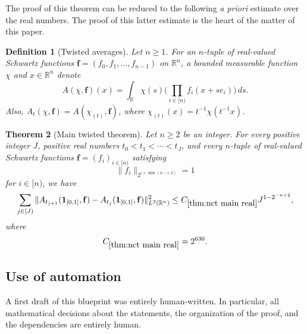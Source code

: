 \documentclass[12pt,reqno]{amsart}
\theoremstyle{plain}
\newtheorem{theorem}{Theorem}[section]
\newtheorem{definition}[theorem]{Definition}
\numberwithin{equation}{section}
\theoremstyle{remark}
\newcommand{\using}[1]{}
\newcommand{\R}{{\mathbb R}}
\begin{document}
The proof of this theorem can be reduced to the following {\em a priori} estimate over the real numbers. The proof of this latter estimate is the heart of the matter of this paper.

\begin{definition}[Twisted averages]
Let $n\geq 1$. For an $n$-tuple of real-valued Schwartz functions $\mathbf f = (f_0,f_1,\dots,f_{n-1})$ on $\R^n$, a bounded measurable function $\chi$ and $x\in\mathbb{R}^n$ denote
\begin{equation}\label{A_def}
A(\chi,\mathbf f)(x) = \int_{\mathbb{R}} \chi(s)\Big(\prod_{i\in [n)} f_i(x+se_i)\Big)\,ds.
\end{equation}
Also, $A_t(\chi,\mathbf{f})=A(\chi_{(t)},\mathbf{f})$, where $\chi_{(t)}(x)=t^{-1}\chi(t^{-1}x)$.
\end{definition}

\begin{theorem}[Main twisted theorem]\label{thm:nct main real}\using{lem:smoothingdecomp}\using{lem:norm_A_sum_le_sum}\using{lem:mainbump1}\using{lem:mainbump2}\using{lem:leftbump}\using{lem:leftbump1}\using{constant main bump one}\using{constant main bump two}\using{constant left bump}\using{constant left bump one}
Let $n\ge 2$ be an integer. For every positive integer $J$, positive real numbers $t_0<t_1<\cdots<t_J$, and every $n$-tuple of real-valued Schwartz functions ${\mathbf f}=(f_i)_{i\in[n)}$ satisfying
\begin{equation}\label{main twisted normalization}
\|f_i\|_{2^{i+\min(n-i,2)}}=1
\end{equation}
for $i\in[n)$, we have
\begin{equation}\label{e:ncommuting_real}
\sum_{j\in[J)}\|A_{t_{j+1}}(\mathbf 1_{[0,1]},\mathbf f)-A_{t_j}(\mathbf 1_{[0,1]},\mathbf f)\|_{L^2(\R^n)}^2
\le C_{\ref{thm:nct main real}}J^{1-2^{-n+2}},
\end{equation}
where
\begin{equation}\label{main twisted theorem constant}
C_{\ref{thm:nct main real}}=2^{630}.
\end{equation}
\end{theorem}

\subsection{Use of automation}\label{sec:comments-on-automation}
A first draft of this blueprint was entirely human-written.
In particular, all mathematical decisions about the statements, the organization of the proof, and the dependencies are entirely human.
\end{document}
